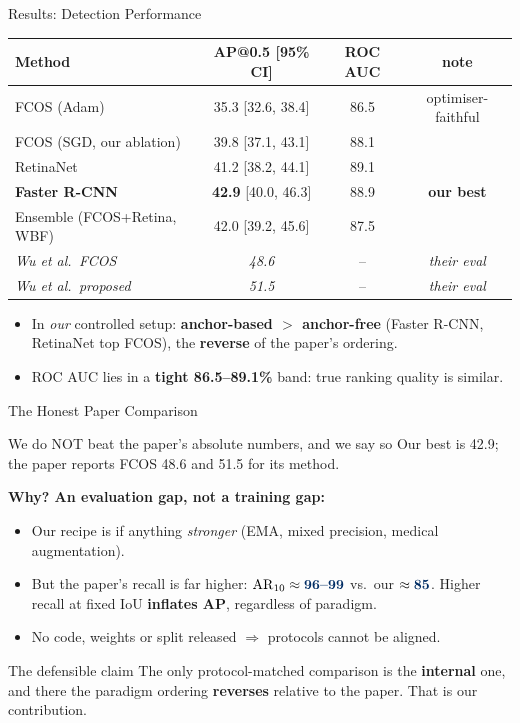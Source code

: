 \documentclass[aspectratio=169,11pt]{beamer}
\newcommand{\hl}[1]{\textcolor{polimi}{\textbf{#1}}}
\begin{document}
\begin{frame}{Results: Detection Performance}
  \centering\footnotesize
  \begin{tabular}{lccc}
    \toprule
    Method & AP@0.5 [95\% CI] & ROC AUC & note \\
    \midrule
    FCOS (Adam) & 35.3 [32.6, 38.4] & 86.5 & optimiser-faithful \\
    FCOS (SGD, our ablation) & 39.8 [37.1, 43.1] & 88.1 & \\
    RetinaNet & 41.2 [38.2, 44.1] & 89.1 & \\
    \textbf{Faster R-CNN} & \textbf{42.9} [40.0, 46.3] & 88.9 & \textbf{our best} \\
    Ensemble (FCOS+Retina, WBF) & 42.0 [39.2, 45.6] & 87.5 & \\
    \midrule
    \textit{Wu et al.\, FCOS} & \textit{48.6} & -- & \textit{their eval} \\
    \textit{Wu et al.\, proposed} & \textit{51.5} & -- & \textit{their eval} \\
    \bottomrule
  \end{tabular}
  \vspace{0.5em}
  \begin{itemize}\small
    \item In \emph{our} controlled setup: \hl{anchor-based $>$ anchor-free} (Faster R-CNN, RetinaNet
      top FCOS), the \hl{reverse} of the paper's ordering.
    \item ROC AUC lies in a \hl{tight 86.5--89.1\%} band: true ranking quality is similar.
  \end{itemize}
\end{frame}

\begin{frame}{The Honest Paper Comparison}
  \small
  \begin{alertblock}{\small We do NOT beat the paper's absolute numbers, and we say so}
    \small Our best is 42.9; the paper reports FCOS 48.6 and 51.5 for its method.
  \end{alertblock}
  \textbf{Why? An evaluation gap, not a training gap:}
  \begin{itemize}\small
    \item Our recipe is if anything \emph{stronger} (EMA, mixed precision, medical augmentation).
    \item But the paper's recall is far higher: $\mathrm{AR}_{10}\approx\hl{96\text{--}99}$ vs.\ our
      $\approx\hl{85}$. Higher recall at fixed IoU \hl{inflates AP}, regardless of paradigm.
    \item No code, weights or split released $\Rightarrow$ protocols cannot be aligned.
  \end{itemize}
  \begin{block}{\small The defensible claim}
    \small The only protocol-matched comparison is the \hl{internal} one, and there the
    paradigm ordering \hl{reverses} relative to the paper. That is our contribution.
  \end{block}
\end{frame}
\end{document}
